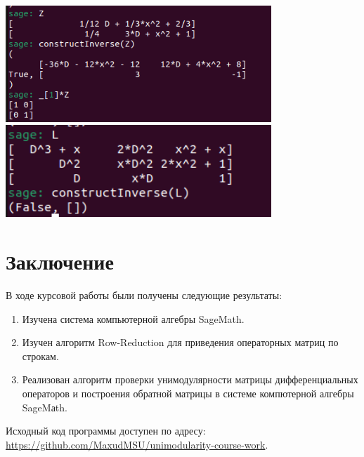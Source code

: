         \includegraphics[width=0.75\textwidth]{im4.png}\\

        \includegraphics[width=0.75\textwidth]{im3.png}
\newpage
\section{Заключение}
    В ходе курсовой работы были получены следующие результаты:
    \begin{enumerate}
        \item Изучена система компьютерной алгебры SageMath.
        \item Изучен алгоритм Row-Reduction для приведения операторных матриц по строкам.
        \item Реализован алгоритм проверки унимодулярности матрицы 
        дифференциальных операторов и построения обратной матрицы 
        в системе компютерной алгебры SageMаth.
    \end{enumerate}


        Исходный код программы доступен по адресу: \url{https://github.com/MaxudMSU/unimodularity-course-work}.